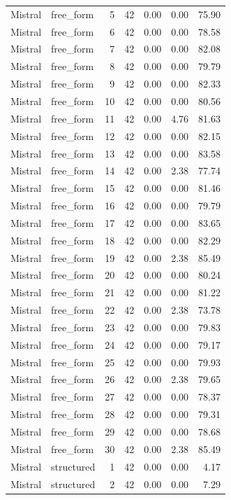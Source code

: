 \begin{longtable}{llrrrrr}
Mistral & free\_form & 5 & 42 & 0.00 & 0.00 & 75.90 \\
Mistral & free\_form & 6 & 42 & 0.00 & 0.00 & 78.58 \\
Mistral & free\_form & 7 & 42 & 0.00 & 0.00 & 82.08 \\
Mistral & free\_form & 8 & 42 & 0.00 & 0.00 & 79.79 \\
Mistral & free\_form & 9 & 42 & 0.00 & 0.00 & 82.33 \\
Mistral & free\_form & 10 & 42 & 0.00 & 0.00 & 80.56 \\
Mistral & free\_form & 11 & 42 & 0.00 & 4.76 & 81.63 \\
Mistral & free\_form & 12 & 42 & 0.00 & 0.00 & 82.15 \\
Mistral & free\_form & 13 & 42 & 0.00 & 0.00 & 83.58 \\
Mistral & free\_form & 14 & 42 & 0.00 & 2.38 & 77.74 \\
Mistral & free\_form & 15 & 42 & 0.00 & 0.00 & 81.46 \\
Mistral & free\_form & 16 & 42 & 0.00 & 0.00 & 79.79 \\
Mistral & free\_form & 17 & 42 & 0.00 & 0.00 & 83.65 \\
Mistral & free\_form & 18 & 42 & 0.00 & 0.00 & 82.29 \\
Mistral & free\_form & 19 & 42 & 0.00 & 2.38 & 85.49 \\
Mistral & free\_form & 20 & 42 & 0.00 & 0.00 & 80.24 \\
Mistral & free\_form & 21 & 42 & 0.00 & 0.00 & 81.22 \\
Mistral & free\_form & 22 & 42 & 0.00 & 2.38 & 73.78 \\
Mistral & free\_form & 23 & 42 & 0.00 & 0.00 & 79.83 \\
Mistral & free\_form & 24 & 42 & 0.00 & 0.00 & 79.17 \\
Mistral & free\_form & 25 & 42 & 0.00 & 0.00 & 79.93 \\
Mistral & free\_form & 26 & 42 & 0.00 & 2.38 & 79.65 \\
Mistral & free\_form & 27 & 42 & 0.00 & 0.00 & 78.37 \\
Mistral & free\_form & 28 & 42 & 0.00 & 0.00 & 79.31 \\
Mistral & free\_form & 29 & 42 & 0.00 & 0.00 & 78.68 \\
Mistral & free\_form & 30 & 42 & 0.00 & 2.38 & 85.49 \\
Mistral & structured & 1 & 42 & 0.00 & 0.00 & 4.17 \\
Mistral & structured & 2 & 42 & 0.00 & 0.00 & 7.29 \\

\end{longtable}
